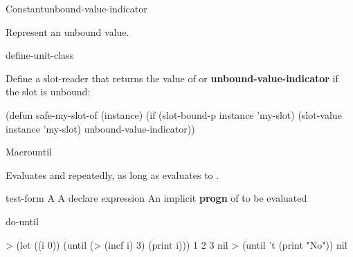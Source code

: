 \documentclass[10pt,twoside,english,pdftex]{article}
\begin{document}
\begin{functiondoc}{Constant}{unbound-value-indicator}{}%

\fnsyntax

\fnpurpose Represent an unbound value.

\fnpackage {}

\fnmodule {}

\begin{alsos}{define-unit-class}
\end{alsos}

\fnexample
Define a slot-reader  that returns the value of  or 
\textbf{unbound-value-indicator} if the slot is unbound: 
%
\W\supp
\begin{example}
(defun safe-my-slot-of (instance)
  (if (slot-bound-p instance 'my-slot)
      (slot-value instance 'my-slot)
      unbound-value-indicator))
\end{example}

\end{functiondoc}


\begin{functiondoc}{Macro}{until}{ 
    \superstar{}
    \superstar}
%
  
\fnsyntax

\fnpurpose Evaluates  and  repeatedly,
as long as  evaluates to \nil.

\fnpackage {}

\fnmodule {}

\fnargs
\begin{args}{test-form}
 A 
\arg[declaration] A declare expression
\arg[forms] An implicit \textbf{progn} of  to be evaluated
\end{args}

\begin{alsos}{do-until}
\also[do-until]
\also[while]
\end{alsos}

\fnexamples
%
\W\supp
\begin{example}
> (let ((i 0)) 
    (until (> (incf i) 3) 
       (print i)))
1 
2 
3 
nil\goodpagebreak
> (until 't (print "No"))
nil
\end{example}

\end{functiondoc}
\end{document}
